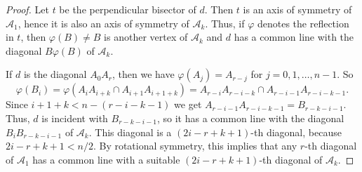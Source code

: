 \documentclass[10pt,a4paper]{amsart}
\begin{document}
\begin{proof}
Let $t$ be the perpendicular bisector of $d$. Then $t$ is an axis of symmetry of $\mathcal{A}_1 $, 
hence it is also an axis of symmetry of $\mathcal{A}_k $. Thus, if $\varphi$ denotes the reflection 
in $t$, then $\varphi (B)\neq B$ is another vertex of $\mathcal{A}_k $ and $d$ has a common line 
with the diagonal  $B\varphi (B)$ of $\mathcal{A}_k $.

If $d$ is the diagonal $A_0A_{r}$, then we have $\varphi (A_j)=A_{r-j}$ 
for $j=0,1,\dots ,n-1.$ So 
$$\varphi (B_i)=\varphi (A_{i}A_{i+k}\cap A_{i+1}A_{i+1+k}) =A_{r-i}A_{r-i-k}
\cap A_{r-i-1}A_{r-i-k-1}.$$ 
Since $i+1+k< n-(r-i-k-1)$ we get $A_{r-i-1}A_{r-i-k-1}=B_{r-k-i-1}$. 
Thus, $d$ is incident with $B_{r-k-i-1}$, so it has a common  line with the diagonal 
$B_iB_{r-k-i-1}$ of $\mathcal{A}_k $. This diagonal is a $(2i-r+k+1)$-th diagonal, 
because $2i-r+k+1<n/2.$ By rotational symmetry, this implies that any
$r$-th diagonal of $\mathcal{A}_1 $
has a common line with a suitable $(2i-r+k+1)$-th diagonal of $\mathcal{A}_k $. 
\end{proof}
\end{document}
